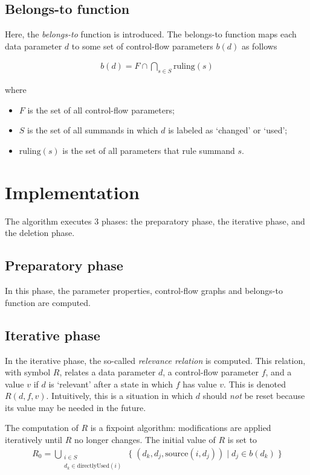 \subsection{Belongs-to function}

Here, the \emph{belongs-to} function is introduced.
The belongs-to function maps each data parameter $d$ to some set of control-flow parameters $b(d)$ as follows

\begin{align*}
b(d) = F \cap \bigcap\limits_{s \in S}^{} \text{ruling}(s)
\end{align*}

where

\begin{itemize}
\item $F$ is the set of all control-flow parameters;
\item $S$ is the set of all summands in which $d$ is labeled as `changed' or `used';
\item $\text{ruling}(s)$ is the set of all parameters that rule summand $s$.
\end{itemize}

\section{Implementation}

The algorithm executes 3 phases: the preparatory phase, the iterative phase, and the deletion phase.

\subsection{Preparatory phase}

In this phase, the parameter properties, control-flow graphs and belongs-to function are computed.

\subsection{Iterative phase}

In the iterative phase, the so-called \emph{relevance relation} is computed.
This relation, with symbol $R$, relates a data parameter $d$, a control-flow parameter $f$, and a value $v$ if $d$ is `relevant' after a state in which $f$ has value $v$.
This is denoted $R(d, f, v)$.
Intuitively, this is a situation in which $d$ should \emph{not} be reset because its value may be needed in the future.

The computation of $R$ is a fixpoint algorithm: modifications are applied iteratively until $R$ no longer changes.
The initial value of $R$ is set to
\begin{align*}
R_0 = \bigcup\limits_{\substack{i \in S \\ d_k \in \text{directlyUsed}(i)}}^{} \;\{\; (d_k, d_j, \text{source}(i, d_j)) \;|\; d_j \in b(d_k) \;\}
\end{align*}

